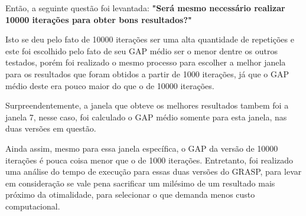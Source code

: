 \documentclass[a4paper, 12pt]{article}
\begin{document}
Então, a seguinte questão foi levantada: \textbf{"Será mesmo necessário realizar 10000 iterações para obter bons resultados?"}

Isto se deu pelo fato de 10000 iterações ser uma alta quantidade de repetições e este foi escolhido
pelo fato de seu GAP médio ser o menor dentre os outros testados, porém foi realizado o 
mesmo processo para escolher a melhor janela para os resultados que foram obtidos a partir de 1000 iterações,
já que o GAP médio deste era pouco maior do que o de 10000 iterações.

Surpreendentemente, a janela que obteve os melhores resultados tambem foi a janela 7, nesse caso, foi calculado
o GAP médio somente para esta janela, nas duas versões em questão.

\begin{table}[htbp]
    \centering
\end{table}

Ainda assim, mesmo para essa janela específica, o GAP da versão de 10000 iterações é pouca coisa menor que o de 1000 iterações.
Entretanto, foi realizado uma análise do tempo de execução para essas duas versões do GRASP, para levar
em consideração se vale pena sacrificar um milésimo de um resultado mais próximo da otimalidade, para 
selecionar o que demanda menos custo computacional.


\end{document}
